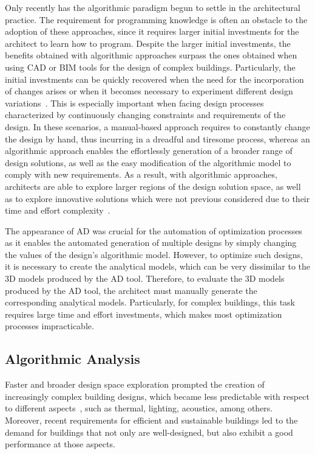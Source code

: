 Only recently has the algorithmic paradigm begun to settle in the architectural practice. The requirement for programming knowledge is often an obstacle to the adoption of these approaches, since it requires larger initial investments for the architect to learn how to program. Despite the larger initial investments, the benefits obtained with algorithmic approaches surpass the ones obtained when using \ac{CAD} or \ac{BIM} tools for the design of complex buildings. Particularly, the initial investments can be quickly recovered when the need for the incorporation of changes arises or when it becomes necessary to experiment different design variations~\cite{Leitao2014GD}. This is especially important when facing design processes characterized by continuously changing constraints and requirements of the design. In these scenarios, a manual-based approach requires to constantly change the design by hand, thus incurring in a dreadful and tiresome process, whereas an algorithmic approach enables the effortlessly generation of a broader range of design solutions, as well as the easy modification of the algorithmic model to comply with new requirements. As a result, with algorithmic approaches, architects are able to explore larger regions of the design solution space, as well as to explore innovative solutions which were not previous considered due to their time and effort complexity~\cite{Leitao2014GD}. 

The appearance of \ac{AD} was crucial for the automation of optimization processes as it enables the automated generation of multiple designs by simply changing the values of the design's algorithmic model. However, to optimize such designs, it is necessary to create the analytical models, which can be very dissimilar to the 3D models produced by the \ac{AD} tool. Therefore, to evaluate the 3D models produced by the \ac{AD} tool, the architect must manually generate the corresponding analytical models. Particularly, for complex buildings, this task requires large time and effort investments, which makes most optimization processes impracticable.

\subsection{Algorithmic Analysis}

Faster and broader design space exploration prompted the creation of increasingly complex building designs, which became less predictable with respect to different aspects~\cite{Branco2017AD}, such as thermal, lighting, acoustics, among others. Moreover, recent requirements for efficient and sustainable buildings led to the demand for buildings that not only are well-designed, but also exhibit a good performance at those aspects.
	
